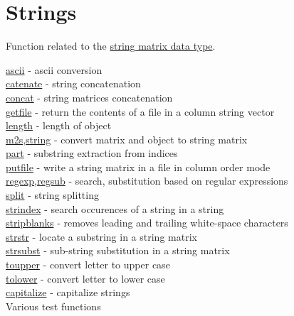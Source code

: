 \chapter*{Strings}

Function related to the \hyperlink{Smat}{string matrix data type}.


\hyperlink{ascii}{ascii} - ascii conversion  \\
\hyperlink{catenate}{catenate} - string concatenation  \\
\hyperlink{concat}{concat} - string matrices concatenation  \\
\hyperlink{getfile}{getfile} - return the contents of a file in a column string vector  \\
\hyperlink{length}{length} - length of object  \\
\hyperlink{m2s}{m2s},\hyperlink{string}{string} - convert matrix and object to string matrix  \\
\hyperlink{part}{part} - substring extraction from indices\\
\hyperlink{putfile}{putfile} - write a string matrix in a file in column order mode \\
\hyperlink{regexp}{regexp},\hyperlink{regsub}{regsub} - search,
substitution based on regular expressions\\
\hyperlink{split}{split} - string splitting\\
\hyperlink{strindex}{strindex} - search occurences of a string in a string\\
\hyperlink{stripblanks}{stripblanks} - removes leading and trailing white-space characters\\
\hyperlink{strstr}{strstr} - locate a substring in a string matrix\\
\hyperlink{strsubst}{strsubst} - sub-string substitution in a string matrix\\
\hyperlink{toupper}{toupper} - convert letter to upper case\\
\hyperlink{tolower}{tolower} - convert letter to lower case\\
\hyperlink{capitalize}{capitalize} - capitalize strings\\

Various test functions

